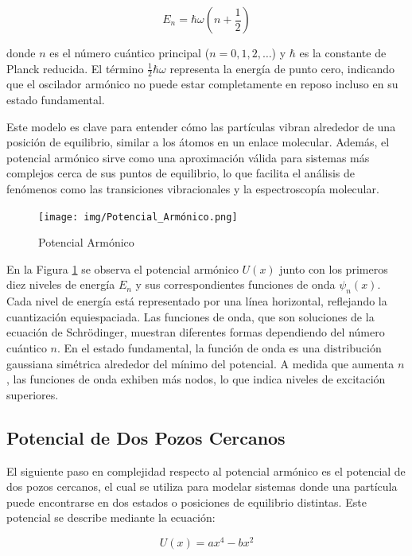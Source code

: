 \documentclass[a4paper,12pt]{article}
\begin{document}
\begin{equation}
    E_n = \hbar \omega \left(n + \frac{1}{2}\right)
\end{equation}

donde \( n \) es el número cuántico principal (\( n = 0, 1, 2, \ldots \)) y \( \hbar \) es la constante de Planck reducida. El término \( \frac{1}{2} \hbar \omega \) representa la energía de punto cero, indicando que el oscilador armónico no puede estar completamente en reposo incluso en su estado fundamental.

Este modelo es clave para entender cómo las partículas vibran alrededor de una posición de equilibrio, similar a los átomos en un enlace molecular. Además, el potencial armónico sirve como una aproximación válida para sistemas más complejos cerca de sus puntos de equilibrio, lo que facilita el análisis de fenómenos como las transiciones vibracionales y la espectroscopía molecular.

\begin{figure}[H]
    \centering
    \texttt{[image: img/Potencial\_Armónico.png]}
    \caption{Potencial Armónico}
    \label{fig:potencial_armonico}
\end{figure}

\noindent
En la Figura \ref{fig:potencial_armonico} se observa el potencial armónico \( U(x) \) junto con los primeros diez niveles de energía \( E_n \) y sus correspondientes funciones de onda \( \psi_n(x) \). Cada nivel de energía está representado por una línea horizontal, reflejando la cuantización equiespaciada. Las funciones de onda, que son soluciones de la ecuación de Schrödinger, muestran diferentes formas dependiendo del número cuántico \( n \). En el estado fundamental, la función de onda es una distribución gaussiana simétrica alrededor del mínimo del potencial. A medida que aumenta \( n \), las funciones de onda exhiben más nodos, lo que indica niveles de excitación superiores.

\subsection{Potencial de Dos Pozos Cercanos}

El siguiente paso en complejidad respecto al potencial armónico es el potencial de dos pozos cercanos, el cual se utiliza para modelar sistemas donde una partícula puede encontrarse en dos estados o posiciones de equilibrio distintas. Este potencial se describe mediante la ecuación:

\begin{equation}
    U(x) = a x^4 - b x^2
\end{equation}
\end{document}
